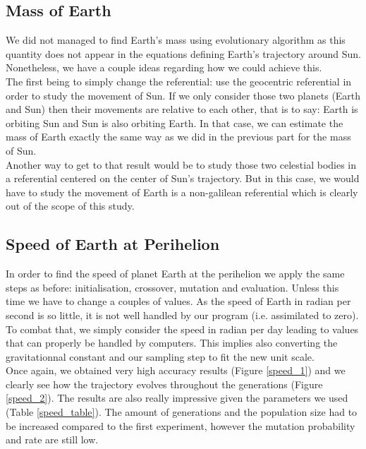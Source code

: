 \subsection{Mass of Earth}
We did not managed to find Earth's mass using evolutionary algorithm as this
quantity does not appear in the equations defining Earth's trajectory around
Sun. Nonetheless, we have a couple ideas regarding how we could achieve this.\\
The first being to simply change the referential: use the geocentric
referential in order to study the movement of Sun. If we only consider those
two planets (Earth and Sun) then their movements are relative to each other,
that is to say: Earth is orbiting Sun and Sun is also orbiting Earth. In that
case, we can estimate the mass of Earth exactly the same way as we did in
the previous part for the mass of Sun.\\
Another way to get to that result would be to study those two celestial bodies
in a referential centered on the center of Sun's trajectory. But in this case,
we would have to study the movement of Earth is a non-galilean referential
which is clearly out of the scope of this study.

\subsection{Speed of Earth at Perihelion}
In order to find the speed of planet Earth at the perihelion we apply the same
steps as before: initialisation, crossover, mutation and evaluation. Unless
this time we have to change a couples of values. As the speed of Earth in
radian per second is so little, it is not well handled by our program (i.e.
assimilated to zero). To combat that, we simply consider the speed in radian
per day leading to values that can properly be handled by computers. This
implies also converting the gravitationnal constant and our sampling step to
fit the new unit scale.\\

Once again, we obtained very high accuracy results (Figure \ref{speed_1}) and
we clearly see how the trajectory evolves throughout the generations (Figure
\ref{speed_2}). The results are also really impressive given the parameters we
used (Table \ref{speed_table}). The amount of generations and the population
size had to be increased compared to the first experiment, however the mutation
probability and rate are still low.\\

